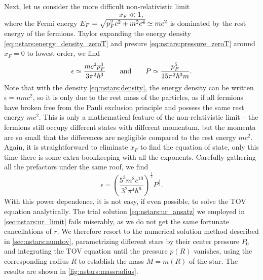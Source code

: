Next, let us consider the more difficult non-relativistic limit
\begin{equation}
	x_F \ll 1,
\label{eq:nstars:nr_limit}
\end{equation}
where the Fermi energy $E_F = \sqrt{p_F^2 c^2 + m^2 c^4} \simeq m c^2$ is dominated by the rest energy of the fermions.
Taylor expanding the energy density \eqref{eq:nstars:energy_density_zeroT} and presure \eqref{eq:nstars:pressure_zeroT} around $x_F = 0$ to lowest order, we find
\begin{equation}
	\epsilon \simeq \frac{m c^2 p_F^3}{3 \pi^2 \hbar^3}
	\qquad \text{and} \qquad
	P        \simeq \frac{p_F^5}{15 \pi^2 \hbar^3 m} .
\end{equation}
Note that with the density \eqref{eq:nstars:density}, the energy density can be written $\epsilon = n m c^2$, so it is only due to the rest mass of the particles, as if all fermions have broken free from the Pauli exclusion principle and possess the same rest energy $m c^2$.
This is only a mathematical feature of the non-relativistic limit -- the fermions still occupy different states with different momentum, but the momenta are so small that the differences are negligible compared to the rest energy $mc^2$.
Again, it is straightforward to eliminate $x_F$ to find the equation of state, only this time there is some extra bookkeeping with all the exponents.
Carefully gathering all the prefactors under the same roof, we find
\begin{equation}
	\epsilon = \left( \frac{5^3 m^8 c^{10}}{3^2 \pi^4 \hbar^6} \right)^{\frac15}  P^{\frac35} .
\end{equation}
With this power dependence, it is not easy, if even possible, to solve the TOV equation analytically.
The trial solution \eqref{eq:nstars:ur_ansatz} we employed in \cref{sec:nstars:ur_limit} fails miserably, as we do not get the same fortunate cancellations of $r$.
We therefore resort to the numerical solution method described in \cref{sec:nstars:numtov}, parametrizing different stars by their center pressure $P_0$ and integrating the TOV equation until the pressure $p(R)$ vanishes, using the corresponding radius $R$ to establish the mass $M = m(R)$ of the star.
The results are shown in \cref{fig:nstars:massradius}.

